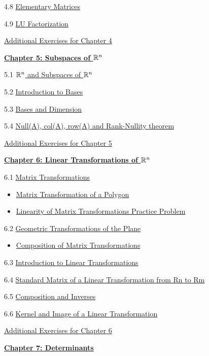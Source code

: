 \documentclass{ximera}
\begin{document}
4.8	\href{\xmbaseurl/MAT-0060/main}{Elementary Matrices}
	
4.9	\href{\xmbaseurl/MAT-0070/main}{LU Factorization}
	
\href{\xmbaseurl/SUPX-0040/main}{Additional Exercises for Chapter 4}
	
\href{\xmbaseurl/XLAChapter_subspacesRn/main}{\textbf{Chapter 5: Subspaces of $\mathbb{R}^n$}}
	
5.1	\href{\xmbaseurl/VSP-0020/main}{$\mathbb{R}^n$ and Subspaces of $\mathbb{R}^n$}
	
5.2	\href{\xmbaseurl/VSP-0030/main}{Introduction to Bases}
	
5.3	\href{\xmbaseurl/VSP-0035/main}{Bases and Dimension}
	
5.4	\href{\xmbaseurl/VSP-0040/main}{Null(A), col(A), row(A) and Rank-Nullity theorem}
	
\href{\xmbaseurl/SUPX-0050/main}{Additional Exercises for Chapter 5}
	
\href{\xmbaseurl/XLAChapter_linTrans/main}{\textbf{Chapter 6: Linear Transformations of $\mathbb{R}^n$}}
	
6.1	\href{\xmbaseurl/LTR-0005/main}{Matrix Transformations}
\begin{itemize}
    \item 
    \href{https://www.geogebra.org/m/cvxdwput}{Matrix Transformation of a Polygon}
    \item
    \href{https://www.geogebra.org/m/nhs3wnqd}{Linearity of Matrix Transformations Practice Problem}
\end{itemize}
	
6.2	\href{\xmbaseurl/LTR-0070/main}{Geometric Transformations of the Plane}
\begin{itemize}
    \item 
    \href{https://www.geogebra.org/m/d6jyt85s}{Composition of Matrix Transformations}
\end{itemize}
	
6.3	\href{\xmbaseurl/LTR-0010/main}{Introduction to Linear Transformations}
	
6.4	\href{\xmbaseurl/LTR-0020/main}{Standard Matrix of a Linear Transformation from Rn to Rm}
	
6.5	\href{\xmbaseurl/LTR-0030/main}{Composition and Inverses}
	
6.6	\href{\xmbaseurl/LTR-0050/main}{Kernel and Image of a Linear Transformation}
	
\href{\xmbaseurl/SUPX-0060/main}{Additional Exercises for Chapter 6}
	
\href{\xmbaseurl/XLAChapter_det/main}{\textbf{Chapter 7: Determinants}}
	
\end{document}
